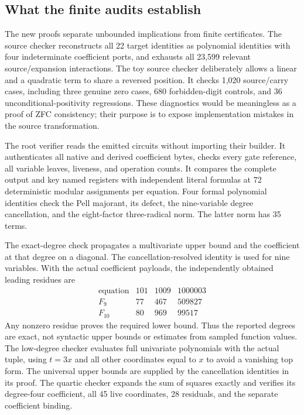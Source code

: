 \documentclass[11pt,a4paper]{article}
\theoremstyle{definition}
\begin{document}
\subsection{What the finite audits establish}

The new proofs separate unbounded implications from finite certificates.
The source checker reconstructs all 22 target identities as polynomial
identities with four indeterminate coefficient ports, and exhausts all
23,599 relevant source/expansion interactions.  The toy source checker
deliberately allows a linear and a quadratic term to share a reversed
position.  It checks 1,020 source/carry cases, including three genuine
zero cases, 680 forbidden-digit controls, and 36 unconditional-positivity
regressions.  These diagnostics would be meaningless as a proof of ZFC
consistency; their purpose is to expose implementation mistakes in the
source transformation.

The root verifier reads the emitted circuits without importing their
builder.  It authenticates all native and derived coefficient bytes,
checks every gate reference, all variable leaves, liveness, and operation
counts.  It compares the complete output and key named registers with
independent literal formulas at 72 deterministic modular assignments per
equation.  Four formal polynomial identities check the Pell majorant,
its defect, the nine-variable degree cancellation, and the eight-factor
three-radical norm.  The latter norm has 35 terms.

The exact-degree check propagates a multivariate upper bound and the
coefficient at that degree on a diagonal.  The cancellation-resolved
identity is used for nine variables.  With the actual coefficient
payloads, the independently obtained leading residues are
\[
\begin{array}{c|rrr}
\text{equation}&101&1009&1000003\\\hline
F_9&77&467&509827\\
F_{10}&80&969&99517
\end{array}
\]
Any nonzero residue proves the required lower bound.  Thus the reported
degrees are exact, not syntactic upper bounds or estimates from sampled
function values.  The low-degree checker evaluates full univariate
polynomials with the actual tuple, using \(t=3x\) and all other
coordinates equal to \(x\) to avoid a vanishing top form.  The universal
upper bounds are supplied by the cancellation identities in its proof.
The quartic checker expands the sum of squares exactly and verifies its
degree-four coefficient, all 45 live coordinates, 28 residuals, and
the separate coefficient binding.
\end{document}
